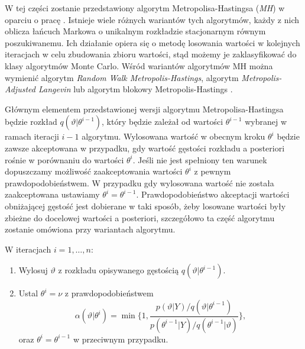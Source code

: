 W tej części zostanie przedstawiony algorytm Metropolisa-Hastingsa (\emph{MH}) w oparciu o pracę \cite{herbst}. Istnieje wiele różnych wariantów tych algorytmów, każdy z nich oblicza łańcuch Markowa o unikalnym rozkładzie stacjonarnym równym poszukiwanemu.  Ich działanie opiera się o metodę losowania wartości w kolejnych iteracjach w celu zbudowania zbioru wartości, stąd możemy je zaklasyfikować do klasy algorytmów Monte Carlo. Wśród wariantów algorytmów MH można wymienić algorytm \emph{Random Walk Metropolis-Hastings}, algorytm \emph{Metropolis-Adjusted Langevin} \cite{herbst} lub algorytm blokowy Metropolis-Hastings \cite{NBERw15774}.

Głównym elementem przedstawionej wersji algorytmu Metropolisa-Hastingsa będzie rozkład $q(\vartheta|\theta^{i-1})$, który będzie zależał od wartości $\theta^{i-1}$ wybranej w ramach iteracji $i-1$ algorytmu. Wylosowana wartość w obecnym kroku $\theta^i$ będzie zawsze akceptowana w przypadku, gdy wartość gęstości rozkładu a posteriori rośnie w porównaniu do wartości $\theta^i$. Jeśli nie jest spełniony ten warunek dopuszczamy możliwość zaakceptowania wartości $\theta^i$ z pewnym prawdopodobieństwem. W przypadku gdy wylosowana wartość nie została zaakceptowana ustawiamy $\theta^i = \theta^{i-1}$. Prawdopodobieństwo akceptacji wartości obniżającej gęstość jest dobierane w taki sposób, żeby losowane wartości były zbieżne do docelowej wartości a posteriori, szczegółowo ta część algorytmu zostanie omówiona przy wariantach algorytmu.

\begin{algDefinition}
    W iteracjach $i = 1, \dots, n$:
    \begin{enumerate}
        \item Wylosuj $\vartheta$ z rozkładu opisywanego gęstością $q(\vartheta|\theta^{i-1})$.
        \item Ustal $\theta^i = \nu$ z prawdopodobieństwem
            \begin{equation}
                \label{eqn:mhalpha}
                \alpha(\vartheta|\theta^i) = \min \{ 1, \frac{p(\vartheta|Y)/q(\vartheta|\theta^{i-1})}{p(\theta^{i-1}|Y)/q(\theta^{i-1}|\vartheta)}\},
            \end{equation}
            oraz $\theta^i = \theta^{i-1}$ w przeciwnym przypadku.
    \end{enumerate}
    
\end{algDefinition}

